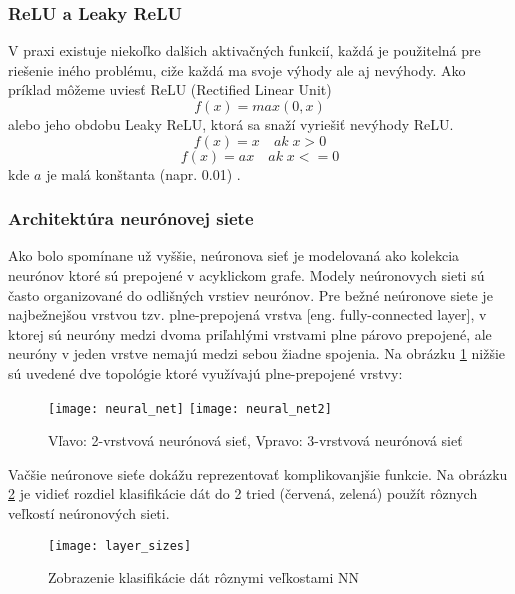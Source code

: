 \subsubsection{ReLU a Leaky ReLU}
V praxi existuje niekoľko dalšich aktivačných funkcií, každá je použitelná pre riešenie iného problému,
    ciže každá ma svoje výhody ale aj nevýhody.
Ako príklad môžeme uviesť ReLU (Rectified Linear Unit)
\begin{equation}
    f(x) = max(0,x)
\end{equation}
alebo jeho obdobu Leaky ReLU, ktorá sa snaží vyriešiť nevýhody ReLU.
\begin{equation}
    f(x) = x \quad ak \; x > 0
\end{equation}
\begin{equation}
    f(x) = ax \quad ak \; x <= 0
\end{equation}
kde $a$ je malá konštanta (napr. 0.01) \cite{odkaz:ConvolutionalNeuralNetworkCS231n}.

\subsubsection{Architektúra neurónovej siete}
Ako bolo spomínane už vyššie, neúronova sieť je modelovaná ako kolekcia neurónov ktoré sú prepojené v acyklickom grafe.
Modely neúronovych sieti sú často organizované do odlišných vrstiev neurónov.
Pre bežné neúronove siete je najbežnejšou vrstvou tzv. plne-prepojená vrstva [eng. fully-connected layer],
    v ktorej sú neuróny medzi dvoma priľahlými vrstvami plne párovo prepojené, ale neuróny v jeden vrstve nemajú medzi sebou žiadne spojenia.
Na obrázku \ref{pic:NeuralNetworkArchitecture} nižšie sú uvedené dve topológie ktoré využívajú plne-prepojené vrstvy\cite{odkaz:ConvolutionalNeuralNetworkCS231n}:
\begin{figure}[H]
    \centering
    \texttt{[image: neural\_net]}
    \qquad
    \texttt{[image: neural\_net2]}
    \caption{Vľavo: 2-vrstvová neurónová sieť, Vpravo: 3-vrstvová neurónová sieť \cite{odkaz:ConvolutionalNeuralNetworkCS231n}}
    \label{pic:NeuralNetworkArchitecture}
\end{figure}

Vačšie neúronove sieťe dokážu reprezentovať komplikovanjšie funkcie.
Na obrázku \ref{pic:XNNLayerExample} je vidieť rozdiel klasifikácie dát do 2 tried (červená, zelená) použít rôznych veľkostí neúronových sieti.
\begin{figure}[H]
	\centering
	\texttt{[image: layer\_sizes]}
	\caption{Zobrazenie klasifikácie dát rôznymi veľkostami NN \cite{odkaz:ConvolutionalNeuralNetworkCS231n}}
	\label{pic:XNNLayerExample}
\end{figure}

